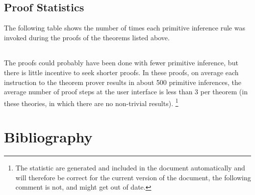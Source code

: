 \pagebreak
\subsection{Proof Statistics}

The following table shows the number of times each primitive inference rule was invoked during the proofs of the theorems listed above.

\begin{centering}
\hfill
{\underscoreoff
\begin{tabular}{| l | l |}
\hline

\end{tabular}
}%
\hfill
\end{centering}

The proofs could probably have been done with fewer primitive inference, but there is little incentive to seek shorter proofs.
In these proofs, on average each instruction to the theorem prover results in about 500 primitive inferences, the average number of proof steps at the user interface is less than 3 per theorem (in these theories, in which there are no non-trivial results).
\footnote{The statistic are generated and included in the document automatically and will therefore be correct for the current version of the document, the following comment is not, and might get out of date.}

\pagebreak

\section*{Bibliography}\label{BIBLIOGRAPHY}

{\def\section*#1{\ignore{#1}}
\raggedright


} %

{
{\small\printindex}}


